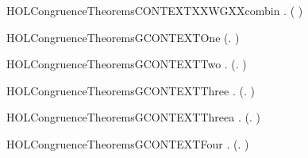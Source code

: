 \newcommand{\HOLCongruenceTheoremsCONTEXTXXstrongind}{\UseVerbatim{HOLCongruenceTheoremsCONTEXTXXstrongind}}
\begin{SaveVerbatim}{HOLCongruenceTheoremsCONTEXTXXWGXXcombin}
\HOLTokenTurnstile{} \HOLSymConst{\HOLTokenForall{}} .   \HOLSymConst{\HOLTokenConj{}}   \HOLSymConst{\HOLTokenImp{}}  ( \HOLConst{\HOLTokenCompose} )
\end{SaveVerbatim}
\newcommand{\HOLCongruenceTheoremsCONTEXTXXWGXXcombin}{\UseVerbatim{HOLCongruenceTheoremsCONTEXTXXWGXXcombin}}
\begin{SaveVerbatim}{HOLCongruenceTheoremsGCONTEXTOne}
\HOLTokenTurnstile{}  (\HOLTokenLambda{}. )
\end{SaveVerbatim}
\newcommand{\HOLCongruenceTheoremsGCONTEXTOne}{\UseVerbatim{HOLCongruenceTheoremsGCONTEXTOne}}
\begin{SaveVerbatim}{HOLCongruenceTheoremsGCONTEXTTwo}
\HOLTokenTurnstile{} \HOLSymConst{\HOLTokenForall{}}.  (\HOLTokenLambda{}. )
\end{SaveVerbatim}
\newcommand{\HOLCongruenceTheoremsGCONTEXTTwo}{\UseVerbatim{HOLCongruenceTheoremsGCONTEXTTwo}}
\begin{SaveVerbatim}{HOLCongruenceTheoremsGCONTEXTThree}
\HOLTokenTurnstile{} \HOLSymConst{\HOLTokenForall{}} .   \HOLSymConst{\HOLTokenImp{}}  (\HOLTokenLambda{}.  )
\end{SaveVerbatim}
\newcommand{\HOLCongruenceTheoremsGCONTEXTThree}{\UseVerbatim{HOLCongruenceTheoremsGCONTEXTThree}}
\begin{SaveVerbatim}{HOLCongruenceTheoremsGCONTEXTThreea}
\HOLTokenTurnstile{} \HOLSymConst{\HOLTokenForall{}}.  (\HOLTokenLambda{}. )
\end{SaveVerbatim}
\newcommand{\HOLCongruenceTheoremsGCONTEXTThreea}{\UseVerbatim{HOLCongruenceTheoremsGCONTEXTThreea}}
\begin{SaveVerbatim}{HOLCongruenceTheoremsGCONTEXTFour}
\HOLTokenTurnstile{} \HOLSymConst{\HOLTokenForall{}}   .
         \HOLSymConst{\HOLTokenConj{}}   \HOLSymConst{\HOLTokenImp{}}
        (\HOLTokenLambda{}.   \HOLSymConst{\ensuremath{+}}  )
\end{SaveVerbatim}
